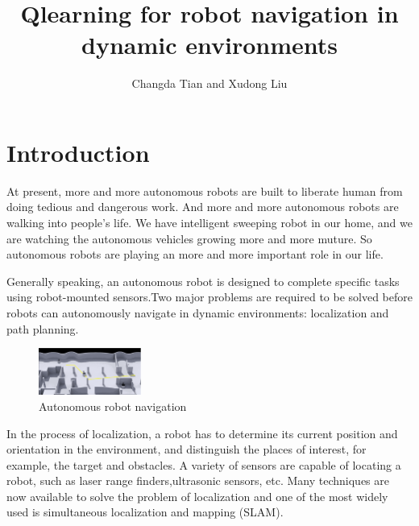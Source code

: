 \documentclass{acmtog} %
\begin{document}
\title{Qlearning for robot navigation in dynamic environments} %

\author{Changda Tian {\upshape and} Xudong Liu
}


\maketitle


\section{Introduction}
At present, more and more autonomous robots are built to liberate human from doing tedious and
dangerous work. And more and more autonomous robots are walking into people's life. We have intelligent
sweeping robot in our home, and we are watching the autonomous vehicles growing more and more muture.
So autonomous robots are playing an more and more important role in our life.

Generally speaking, an autonomous robot is designed to complete specific tasks
using robot-mounted sensors.Two major problems are required to be solved before
robots can autonomously navigate in dynamic environments: localization and path planning.
\begin{figure}[H]
	\centering
	\includegraphics[width=0.3\textwidth]{int.PNG}
	\caption{Autonomous robot navigation}
\end{figure}
In the process of localization, a robot has to determine its current position and orientation in the
environment, and distinguish the places of interest, for example, the target and obstacles. A variety of
sensors are capable of locating a robot, such as laser range finders,ultrasonic sensors, etc.
Many techniques are now available to solve the problem of localization and one of the most widely
used is simultaneous localization and mapping (SLAM).
\end{document}
